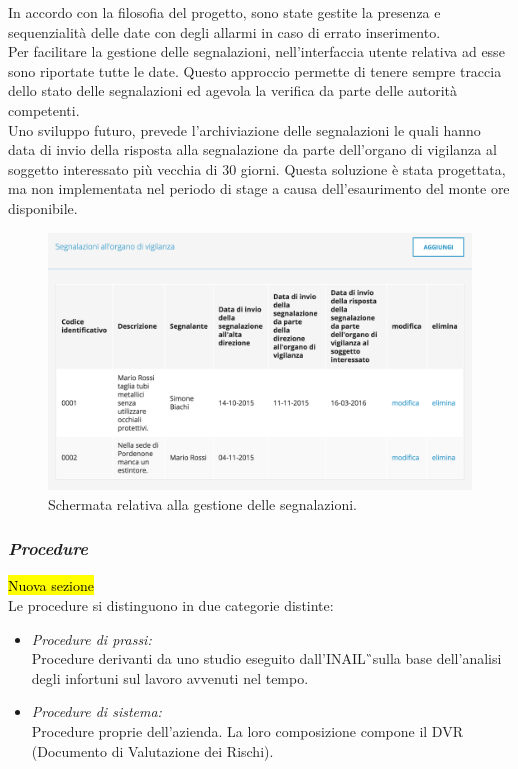 	In accordo con la filosofia del progetto, sono state gestite la presenza e sequenzialità delle date con degli allarmi in caso di errato inserimento.\\
	Per facilitare la gestione delle segnalazioni, nell'interfaccia utente relativa ad esse sono riportate tutte le date. Questo approccio permette di tenere sempre traccia dello stato delle segnalazioni ed agevola la verifica da parte delle autorità competenti.\\
	Uno sviluppo futuro, prevede l'archiviazione delle segnalazioni le quali hanno data di invio della risposta alla segnalazione da parte dell'organo di vigilanza al soggetto interessato più vecchia di 30 giorni. Questa soluzione è stata progettata, ma non implementata nel periodo di stage a causa dell'esaurimento del monte ore disponibile.
	\begin{figure}[H]
		\begin{center}
			\includegraphics[width=12cm]{Pics/ScreenSegnalazioni.png}
			\caption{Schermata relativa alla gestione delle segnalazioni.}
			\label{fig:ScreenSegnalazioni}
		\end{center}
	\end{figure}
\newpage
\subsubsection{\textit{Procedure}}
\hl{Nuova sezione}\\
	Le procedure si distinguono in due categorie distinte:
	\begin{itemize}
		\item \textit{Procedure di prassi:}	\\
			Procedure derivanti da uno studio eseguito dall'\gls{INAIL}\G\ sulla base dell'analisi degli infortuni sul lavoro avvenuti nel tempo.
		\item \textit{Procedure di sistema:}\\
			Procedure proprie dell'azienda. La loro composizione compone il  \gls{DVR} (Documento di Valutazione dei Rischi).
	\end{itemize}

